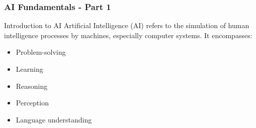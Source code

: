 \documentclass{beamer}
\begin{document}
\begin{frame}[fragile]
    \frametitle{AI Fundamentals - Part 1}
    \begin{block}{Introduction to AI}
        Artificial Intelligence (AI) refers to the simulation of human intelligence processes by machines, especially computer systems. It encompasses:
        \begin{itemize}
            \item Problem-solving
            \item Learning
            \item Reasoning
            \item Perception
            \item Language understanding
        \end{itemize}
    \end{block}
\end{frame}
\end{document}
